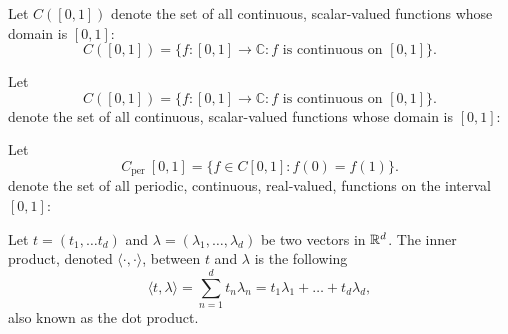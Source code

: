 \documentclass[../thesis.tex]{subfiles}
\begin{document}

Let $C([0,1])$ denote the set of all continuous, scalar-valued functions whose domain is $[0,1]$:
\begin{equation}
    C([0,1]) = \{f:[0,1] \rightarrow \mathbb{C}: f \text{ is continuous on } [0,1]\}.
\end{equation}

Let
\begin{equation}
    C([0,1]) = \{f:[0,1] \rightarrow \mathbb{C}: f \text{ is continuous on } [0,1]\}.
\end{equation}
denote the set of all continuous, scalar-valued functions whose domain is $[0,1]$:



Let
\begin{equation*}
C_{\text {per }}[0,1]=\{f \in C[0,1]: f(0)=f(1)\}.
\end{equation*}
denote the set of all periodic, continuous, real-valued, functions on the interval $[0,1]$:



\begin{definition}\label{eq:dot_prod}
    Let $t=(t_1,\dots t_d)$ and $\lambda=(\lambda_1, \dots, \lambda_d)$ be two vectors in $\mathbb{R}^d$. The inner product, denoted $\langle \cdot, \cdot \rangle$, between $t$ and $\lambda$ is the following 
    \begin{equation}
        \langle t, \lambda \rangle = \sum_{n=1}^d t_n \lambda_n = t_1\lambda_1 + \dots + t_d\lambda_d,
    \end{equation}
    also known as the dot product. 
\end{definition}
\end{document}
